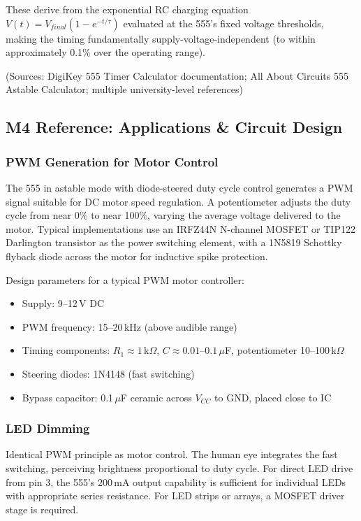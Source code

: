 \documentclass[11pt,letterpaper]{article}
\begin{document}
These derive from the exponential RC charging equation $V(t) = V_{final}(1 - e^{-t/\tau})$ evaluated at the 555's fixed voltage thresholds, making the timing fundamentally supply-voltage-independent (to within approximately 0.1\% over the operating range).

(Sources: DigiKey 555 Timer Calculator documentation; All About Circuits 555 Astable Calculator; multiple university-level references)

\subsection{M4 Reference: Applications \& Circuit Design}

\subsubsection{PWM Generation for Motor Control}

The 555 in astable mode with diode-steered duty cycle control generates a PWM signal suitable for DC motor speed regulation. A potentiometer adjusts the duty cycle from near 0\% to near 100\%, varying the average voltage delivered to the motor. Typical implementations use an IRFZ44N N-channel MOSFET or TIP122 Darlington transistor as the power switching element, with a 1N5819 Schottky flyback diode across the motor for inductive spike protection.

Design parameters for a typical PWM motor controller:
\begin{itemize}[leftmargin=2em]
  \item Supply: 9--12\,V DC
  \item PWM frequency: 15--20\,kHz (above audible range)
  \item Timing components: $R_1 \approx 1$\,k$\Omega$, $C \approx 0.01$--$0.1\,\mu$F, potentiometer 10--100\,k$\Omega$
  \item Steering diodes: 1N4148 (fast switching)
  \item Bypass capacitor: 0.1\,$\mu$F ceramic across $V_{CC}$ to GND, placed close to IC
\end{itemize}

\subsubsection{LED Dimming}

Identical PWM principle as motor control. The human eye integrates the fast switching, perceiving brightness proportional to duty cycle. For direct LED drive from pin 3, the 555's 200\,mA output capability is sufficient for individual LEDs with appropriate series resistance. For LED strips or arrays, a MOSFET driver stage is required.
\end{document}
